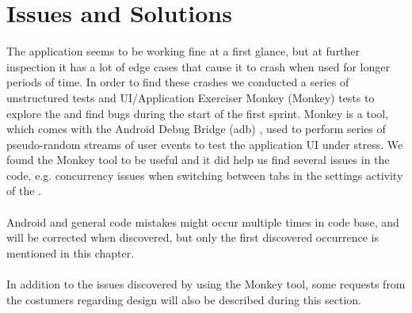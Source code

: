 
\chapter{Issues and Solutions}
\label{sec:sprintone_issues_solutions}
The \launcher application seems to be working fine at a first glance, but at further inspection it has a lot of edge cases that cause it to crash when used for longer periods of time. In order to find these crashes we conducted a series of unstructured tests and UI/Application Exerciser Monkey (Monkey) \parencite{android_monkey} tests to explore the \launcher and find bugs during the start of the first sprint. Monkey is a tool, which comes with the Android Debug Bridge (adb) \parencite{android_adb}, used to perform series of pseudo-random streams of user events to test the application UI under stress. We found the Monkey tool to be useful and it did help us find several issues in the code, e.g. concurrency issues when switching between tabs in the settings activity of the \launcher.
\\\\
Android and general code mistakes might occur multiple times in code base, and will be corrected when discovered, but only the first discovered occurrence is mentioned in this chapter. 
\\\\
In addition to the issues discovered by using the Monkey tool, some requests from the costumers regarding design will also be described during this section.





















